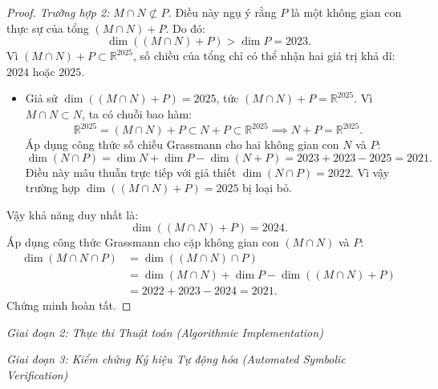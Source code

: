 \documentclass{article}
\begin{document}
\begin{proof}
\emph{Trường hợp 2: $M \cap N \not\subset P$.}
Điều này ngụ ý rằng $P$ là một không gian con thực sự của tổng $(M \cap N) + P$. Do đó:
\begin{equation}
    \dim((M \cap N) + P) > \dim P = 2023.
\end{equation}
Vì $(M \cap N) + P \subset \mathbb{R}^{2025}$, số chiều của tổng chỉ có thể nhận hai giá trị khả dĩ: $2024$ hoặc $2025$.
\begin{itemize}
    \item Giả sử $\dim((M \cap N) + P) = 2025$, tức $(M \cap N) + P = \mathbb{R}^{2025}$.
    Vì $M \cap N \subset N$, ta có chuỗi bao hàm:
    \begin{equation}
        \mathbb{R}^{2025} = (M \cap N) + P \subset N + P \subset \mathbb{R}^{2025} \implies N + P = \mathbb{R}^{2025}.
    \end{equation}
    Áp dụng công thức số chiều Grassmann cho hai không gian con $N$ và $P$:
    \begin{equation}
        \dim(N \cap P) = \dim N + \dim P - \dim(N + P) = 2023 + 2023 - 2025 = 2021.
    \end{equation}
    Điều này mâu thuẫn trực tiếp với giả thiết $\dim(N \cap P) = 2022$. Vì vậy trường hợp $\dim((M \cap N) + P) = 2025$ bị loại bỏ.
\end{itemize}
Vậy khả năng duy nhất là:
\begin{equation}
    \dim((M \cap N) + P) = 2024.
\end{equation}
Áp dụng công thức Grassmann cho cặp không gian con $(M \cap N)$ và $P$:
\begin{align}
    \dim(M \cap N \cap P) &= \dim((M \cap N) \cap P) \nonumber \\
    &= \dim(M \cap N) + \dim P - \dim((M \cap N) + P) \nonumber \\
    &= 2022 + 2023 - 2024 = 2021.
\end{align}
Chứng minh hoàn tất.
\end{proof}

\vspace{0.5em}\noindent\emph{Giai đoạn 2: Thực thi Thuật toán (Algorithmic Implementation)}


\vspace{0.5em}\noindent\emph{Giai đoạn 3: Kiểm chứng Ký hiệu Tự động hóa (Automated Symbolic Verification)}

\end{document}

